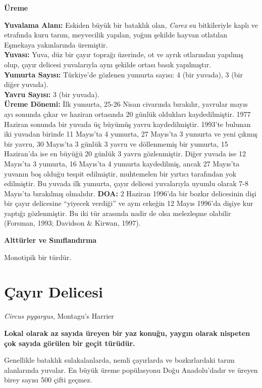 \documentclass[
  a4paper,
  DIV=11,
  numbers=noendperiod]{scrreprt}
\begin{document}
\textbf{Üreme}

\textbf{Yuvalama Alanı:} Eskiden büyük bir bataklık olan, \emph{Carex}
su bitkileriyle kaplı ve etrafında kuru tarım, meyvecilik yapılan, yoğun
şekilde hayvan otlatılan Eşmekaya yakınlarında üremiştir.\\
\textbf{Yuvası:} Yuva, düz bir çayır toprağı üzerinde, ot ve ayrık
otlarından yapılmış olup, çayır delicesi yuvalarıyla aynı şekilde ortası
basık yapılmıştır.\\
\textbf{Yumurta Sayısı:} Türkiye'de gözlenen yumurta sayısı: 4 (bir
yuvada), 3 (bir diğer yuvada).\\
\textbf{Yavru Sayısı:} 3 (bir yuvada).\\
\textbf{Üreme Dönemi:} İlk yumurta, 25-26 Nisan civarında bırakılır,
yavrular mayıs ayı sonunda çıkar ve haziran ortasında 20 günlük
oldukları kaydedilmiştir. 1977 Haziran sonunda bir yuvada üç büyümüş
yavru kaydedilmiştir. 1993'te bulunan iki yuvadan birinde 11 Mayıs'ta 4
yumurta, 27 Mayıs'ta 3 yumurta ve yeni çıkmış bir yavru, 30 Mayıs'ta 3
günlük 3 yavru ve döllenmemiş bir yumurta, 15 Haziran'da ise en büyüğü
20 günlük 3 yavru gözlenmiştir. Diğer yuvada ise 12 Mayıs'ta 3 yumurta,
16 Mayıs'ta 4 yumurta kaydedilmiş, ancak 27 Mayıs'ta yuvanın boş olduğu
tespit edilmiştir, muhtemelen bir yırtıcı tarafından yok edilmiştir. Bu
yuvada ilk yumurta, çayır delicesi yuvalarıyla uyumlu olarak 7-8
Mayıs'ta bırakılmış olmalıdır. \textbf{DOA:} 2 Haziran 1996'da bir
bozkır delicesinin dişi bir çayır delicesine ``yiyecek verdiği'' ve aynı
erkeğin 12 Mayıs 1996'da dişiye kur yaptığı gözlenmiştir. Bu iki tür
arasında nadir de olsa melezleşme olabilir (Forsman, 1993; Davidson \&
Kirwan, 1997).

\textbf{Alttürler ve Sınıflandırma}

Monotipik bir türdür.

\section{Çayır Delicesi}\label{uxe7ayux131r-delicesi}

\emph{Circus pygargus}, Montagu's Harrier

\textbf{Lokal olarak az sayıda üreyen bir yaz konuğu, yaygın olarak
nispeten çok sayıda görülen bir geçit türüdür.}

Genellikle bataklık sulakalanlarda, nemli çayırlarda ve bozkırlardaki
tarım alanlarında yuvalar. En büyük üreme popülasyonu Doğu Anadolu'dadır
ve üreyen birey sayısı 500 çifti geçmez.
\end{document}
